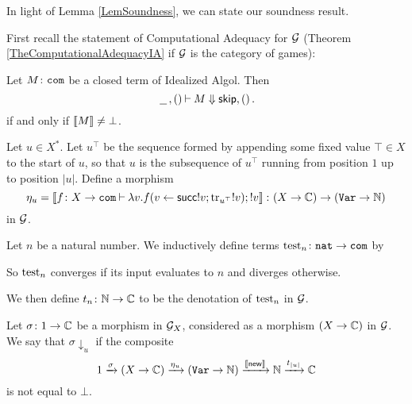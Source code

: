 \documentclass[11pt]{report}
\begin{document}
In light of Lemma \ref{LemSoundness}, we can state our soundness result.

First recall the statement of Computational Adequacy for $\mathcal G$ (Theorem \ref{TheComputationalAdequacyIA} if $\mathcal G$ is the category of games):

\begin{theorem}
  Let $M\colon {\mathtt{com}}$ be a closed term of Idealized Algol.  
  Then
  \[
    \,\underline{\hspace{1.5ex}}\,,()\mathbin{\vdash} M\Downarrow {\mathsf{skip}},()\,.
    \]
  if and only if $\left\llbracket M\right\rrbracket \ne \bot$.
\end{theorem}

\begin{definition}
  Let $u\in X^*$.
  Let $u^\top$ be the sequence formed by appending some fixed value $\top\in X$ to the start of $u$, so that $u$ is the subsequence of $u^\top$ running from position $1$ up to position $|u|$.
  Define a morphism
  \[
    \eta_u = \left\llbracket f\colon X \to {\mathtt{com}} \mathbin{\vdash} \lambda v.f(v\gets \operatorname{{\mathsf{succ}}} !v;\operatorname{tr}_{u^\top} !v);!v\right\rrbracket \colon (X \to \mathbb{C}) \to ({\mathtt{Var}} \to \mathbb{N})
    \]
  in $\mathcal G$.
\end{definition}

\begin{definition}
  Let $n$ be a natural number.  
  We inductively define terms $\operatorname{test}_n\colon {\mathtt{nat}} \to {\mathtt{com}}$ by
  So $\operatorname{test}_n$ converges if its input evaluates to $n$ and diverges otherwise.

  We then define $t_n\colon \mathbb{N} \to \mathbb{C}$ to be the denotation of $\operatorname{test}_n$ in $\mathcal G$.
\end{definition}

\begin{definition}
  Let $\sigma \colon 1 \to \mathbb{C}$ be a morphism in $\mathcal G_X$, considered as a morphism $(X \to \mathbb{C})$ in $\mathcal G$.  
  We say that $\sigma\downarrow_u$ if the composite
  \[
    1 \xrightarrow{\sigma}
    (X \to \mathbb{C}) \xrightarrow{\eta_u}
    ({\mathtt{Var}} \to \mathbb{N}) \xrightarrow{\left\llbracket\operatorname{{\mathsf{new}}}\right\rrbracket}
    \mathbb{N} \xrightarrow{t_{|u|}}
    \mathbb{C}
    \]
  is not equal to $\bot$.
\end{definition}
\end{document}
